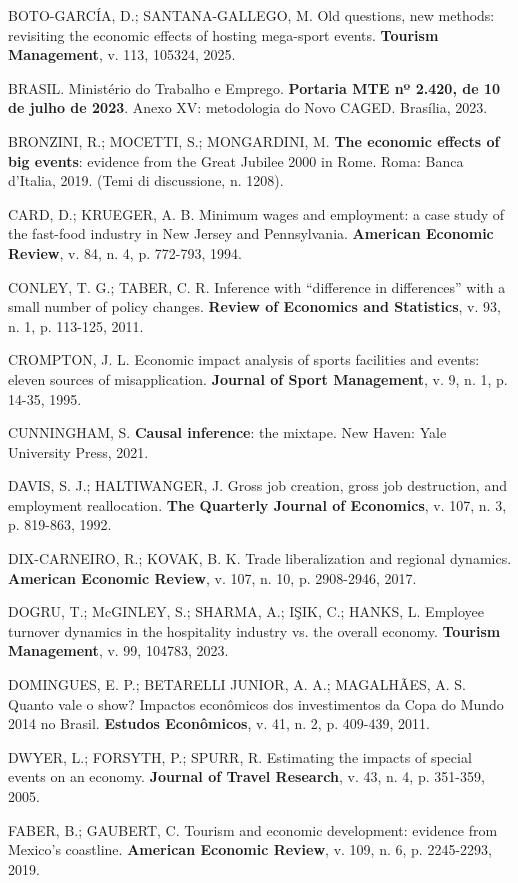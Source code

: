 \begin{singlespace}
BOTO-GARCÍA, D.; SANTANA-GALLEGO, M. Old questions, new methods: revisiting
the economic effects of hosting mega-sport events. \textbf{Tourism
Management}, v. 113, 105324, 2025.

BRASIL. Ministério do Trabalho e Emprego. \textbf{Portaria MTE nº 2.420, de
10 de julho de 2023}. Anexo XV: metodologia do Novo CAGED. Brasília, 2023.

BRONZINI, R.; MOCETTI, S.; MONGARDINI, M. \textbf{The economic effects of
big events}: evidence from the Great Jubilee 2000 in Rome. Roma: Banca
d'Italia, 2019. (Temi di discussione, n. 1208).

CARD, D.; KRUEGER, A. B. Minimum wages and employment: a case study of the fast-food industry in New Jersey and Pennsylvania. \textbf{American Economic Review}, v. 84, n. 4, p. 772-793, 1994.

CONLEY, T. G.; TABER, C. R. Inference with ``difference in differences'' with a small number of policy changes. \textbf{Review of Economics and Statistics}, v. 93, n. 1, p. 113-125, 2011.

CROMPTON, J. L. Economic impact analysis of sports facilities and events:
eleven sources of misapplication. \textbf{Journal of Sport Management}, v. 9,
n. 1, p. 14-35, 1995.

CUNNINGHAM, S. \textbf{Causal inference}: the mixtape. New Haven: Yale University Press, 2021.

DAVIS, S. J.; HALTIWANGER, J. Gross job creation, gross job destruction, and
employment reallocation. \textbf{The Quarterly Journal of Economics}, v. 107,
n. 3, p. 819-863, 1992.

DIX-CARNEIRO, R.; KOVAK, B. K. Trade liberalization and regional dynamics. \textbf{American Economic Review}, v. 107, n. 10, p. 2908-2946, 2017.

DOGRU, T.; McGINLEY, S.; SHARMA, A.; IŞIK, C.; HANKS, L. Employee turnover
dynamics in the hospitality industry vs. the overall economy.
\textbf{Tourism Management}, v. 99, 104783, 2023.

DOMINGUES, E. P.; BETARELLI JUNIOR, A. A.; MAGALHÃES, A. S. Quanto vale o
show? Impactos econômicos dos investimentos da Copa do Mundo 2014 no Brasil.
\textbf{Estudos Econômicos}, v. 41, n. 2, p. 409-439, 2011.

DWYER, L.; FORSYTH, P.; SPURR, R. Estimating the impacts of special events on an economy. \textbf{Journal of Travel Research}, v. 43, n. 4, p. 351-359, 2005.

FABER, B.; GAUBERT, C. Tourism and economic development: evidence from Mexico's coastline. \textbf{American Economic Review}, v. 109, n. 6, p. 2245-2293, 2019.


\end{singlespace}
